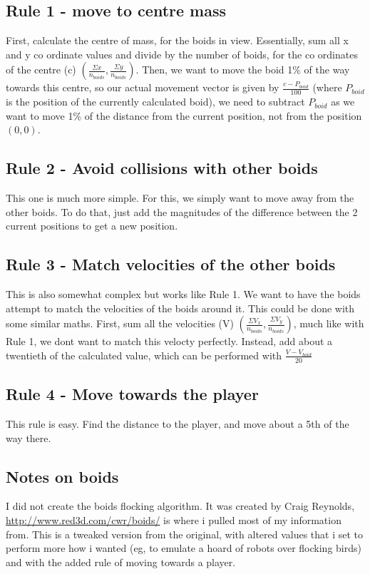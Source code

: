 \subsection{Rule 1 - move to centre mass}
First, calculate the centre of mass, for the boids in view. Essentially, sum all x and y co ordinate values and divide by the number of boids, for the co ordinates of the centre (c) $(\frac{\Sigma x}{n_{boids}},\frac{\Sigma y}{n_{boids}})$. Then, we want to move the boid 1\% of the way towards this centre, so our actual movement vector is given by $\frac{c - P_{boid}}{100}$ (where $P_{boid}$ is the position of the currently calculated boid), we need to subtract $P_{boid}$ as we want to move 1\% of the distance from the current position, not from the position $(0,0)$.
    
\subsection{Rule 2 - Avoid collisions with other boids}
This one is much more simple. For this, we simply want to move away from the other boids. To do that, just add the magnitudes of the difference between the 2 current positions to get a new position. 

\subsection{Rule 3 - Match velocities of the other boids}
This is also somewhat complex but works like Rule 1. We want to have the boids attempt to match the velocities of the boids around it. This could be done with some similar maths. First, sum all the velocities (V) $(\frac{\Sigma V_x}{n_{boids}},\frac{\Sigma V_y}{n_{boids}})$, much like with Rule 1, we dont want to match this velocty perfectly. Instead, add about a twentieth of the calculated value, which can be performed with $\frac{V - V_{boid}}{20}$

\subsection{Rule 4 - Move towards the player}
This rule is easy. Find the distance to the player, and move about a 5th of the way there.

\subsection{Notes on boids}
I did not create the boids flocking algorithm. It was created by Craig Reynolds, \url{http://www.red3d.com/cwr/boids/} is where i pulled most of my information from. This is a tweaked version from the original, with altered values that i set to perform more how i wanted (eg, to emulate a hoard of robots over flocking birds) and with the added rule of moving towards a player. 

